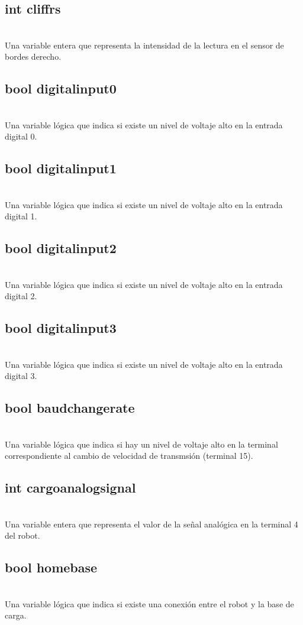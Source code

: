 \documentclass[letterpaper]{book}
\begin{document}
\subsection{int cliffrs}\mbox{}\\
Una variable entera que representa la intensidad de la lectura en el sensor de bordes derecho.
\subsection{bool digitalinput0}\mbox{}\\
Una variable lógica que indica si existe un nivel de voltaje alto en la entrada digital 0.
\subsection{bool digitalinput1}\mbox{}\\
Una variable lógica que indica si existe un nivel de voltaje alto en la entrada digital 1.
\subsection{bool digitalinput2}\mbox{}\\
Una variable lógica que indica si existe un nivel de voltaje alto en la entrada digital 2.
\subsection{bool digitalinput3}\mbox{}\\
Una variable lógica que indica si existe un nivel de voltaje alto en la entrada digital 3.
\subsection{bool baudchangerate}\mbox{}\\
Una variable lógica que indica si hay un nivel de voltaje alto en la terminal correspondiente al cambio de velocidad de transmsión (terminal 15).
\subsection{int cargoanalogsignal}\mbox{}\\
Una variable entera que representa el valor de la señal analógica en la terminal 4 del robot.
\subsection{bool homebase}\mbox{}\\
Una variable lógica que indica si existe una conexión entre el robot y la base de carga.
\end{document}
